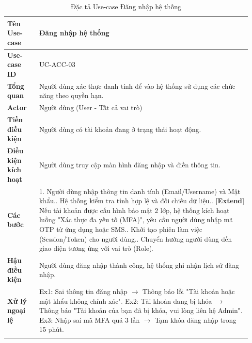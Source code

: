 \begin{longtable}{|p{3.5cm}|p{11.5cm}|}
    \hline
    \textbf{Tên Use-case} & \textbf{Đăng nhập hệ thống} \\
    \hline
    \textbf{Use-case ID} & UC-ACC-03 \\
    \hline
    \textbf{Tổng quan} & Người dùng xác thực danh tính để vào hệ thống sử dụng các chức năng theo quyền hạn. \\
    \hline
    \textbf{Actor} & Người dùng (User - Tất cả vai trò) \\
    \hline
    \textbf{Tiền điều kiện} & Người dùng có tài khoản đang ở trạng thái hoạt động. \\
    \hline
    \textbf{Điều kiện kích hoạt} & Người dùng truy cập màn hình đăng nhập và điền thông tin. \\
    \hline
    \textbf{Các bước} & 
    1. Người dùng nhập thông tin danh tính (Email/Username) và Mật khẩu.\newline
    2. Hệ thống kiểm tra tính hợp lệ và đối chiếu dữ liệu.\newline
    3. \textbf{[Extend]} Nếu tài khoản được cấu hình bảo mật 2 lớp, hệ thống kích hoạt luồng "Xác thực đa yếu tố (MFA)", yêu cầu người dùng nhập mã OTP từ ứng dụng hoặc SMS.\newline
    4. Khởi tạo phiên làm việc (Session/Token) cho người dùng.\newline
    5. Chuyển hướng người dùng đến giao diện tương ứng với vai trò (Role). \\
    \hline
    \textbf{Hậu điều kiện} & Người dùng đăng nhập thành công, hệ thống ghi nhận lịch sử đăng nhập. \\
    \hline
    \textbf{Xử lý ngoại lệ} & 
    Ex1: Sai thông tin đăng nhập $\rightarrow$ Thông báo lỗi "Tài khoản hoặc mật khẩu không chính xác".\newline
    Ex2: Tài khoản đang bị khóa $\rightarrow$ Thông báo "Tài khoản của bạn đã bị khóa, vui lòng liên hệ Admin".\newline
    Ex3: Nhập sai mã MFA quá 3 lần $\rightarrow$ Tạm khóa đăng nhập trong 15 phút. \\
    \hline
    \caption{Đặc tả Use-case Đăng nhập hệ thống}
\end{longtable}

